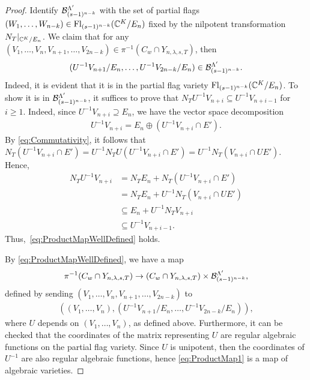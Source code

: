 \documentclass[12pt]{amsart}
\newcommand{\Fl}{\mathrm{Fl}}
\newcommand{\la}{\lambda}
\begin{document}
\begin{proof}
Identify $\mathcal{B}_{(s-1)^{n-k}}^{\Lambda'}$ with the set of partial flags $(W_1,\dots, W_{n-k})\in \Fl_{(s-1)^{n-k}}(\bC^K/E_n)$ fixed by the nilpotent transformation $N_T|_{\mathbb{C}^K/E_n}$. We claim that for any $(V_1,\dots, V_n,V_{n+1},\dots, V_{2n-k})\in \pi^{-1}(C_{w}\cap Y_{n,\la,s,T})$, then 
\begin{align}\label{eq:ProductMapWellDefined}
(U^{-1} V_{n+1}/E_n,\dots, U^{-1}V_{2n-k}/E_n)\in \mathcal{B}_{(s-1)^{n-k}}^{\Lambda'}.
\end{align}
Indeed, it is evident that it is in the partial flag variety $\Fl_{(s-1)^{n-k}}(\bC^K/E_n)$. To show it is in $\mathcal{B}_{(s-1)^{n-k}}^{\Lambda'}$, it suffices to prove that $N_T U^{-1} V_{n+i} \subseteq U^{-1} V_{n+i-1}$ for $i\geq 1$. Indeed, since $U^{-1} V_{n+i}\supseteq E_n$, we have the vector space decomposition
\begin{align}
U^{-1}V_{n+i} = E_n\oplus (U^{-1}V_{n+i}\cap E').
\end{align}
By \eqref{eq:Commutativity}, it follows that $N_T(U^{-1} V_{n+i} \cap E') = U^{-1} N_T U (U^{-1}V_{n+i}\cap E') = U^{-1}N_T(V_{n+i}\cap U E')$. Hence,
\begin{align}
N_TU^{-1} V_{n+i} &= N_T E_n + N_T(U^{-1}V_{n+i}\cap E') \\
&= N_TE_n + U^{-1} N_T(V_{n+i}\cap UE')\\
&\subseteq E_n + U^{-1} N_TV_{n+i} \\
&\subseteq U^{-1} V_{n+i-1}.
\end{align}
Thus,~\eqref{eq:ProductMapWellDefined} holds.

By \eqref{eq:ProductMapWellDefined}, we have a map
\begin{align}\label{eq:ProductMap1}
\pi^{-1}(C_{w}\cap Y_{n,\la,s,T}) \to (C_{w}\cap Y_{n,\la,s,T})\times \cB_{(s-1)^{n-k}}^{\Lambda'},
\end{align}
defined by sending $(V_1,\dots, V_n,V_{n+1},\dots, V_{2n-k})$ to 
\begin{align}
((V_1,\dots, V_n), (U^{-1} V_{n+1}/E_n,\dots, U^{-1}V_{2n-k}/E_n)),
\end{align}
where $U$ depends on $(V_1,\dots, V_n)$, as defined above. Furthermore, it can be checked that the coordinates of the matrix representing $U$ are regular algebraic functions on the partial flag variety. Since $U$ is unipotent, then the coordinates of $U^{-1}$ are also regular algebraic functions, hence \eqref{eq:ProductMap1} is a map of algebraic varieties. 


\end{proof}
\end{document}
